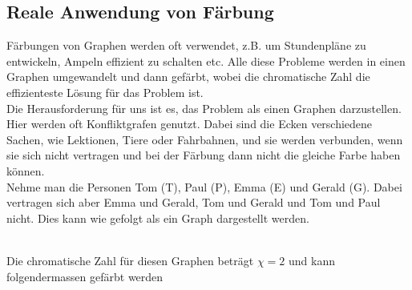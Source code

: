 \documentclass{article}
\begin{document}
\subsection{Reale Anwendung von Färbung}

Färbungen von Graphen werden oft verwendet, z.B. um Stundenpläne zu entwickeln, Ampeln effizient zu schalten etc. Alle diese Probleme werden in einen Graphen umgewandelt und dann gefärbt, wobei die chromatische Zahl die effizienteste Lösung für das Problem ist. \\

\noindent Die Herausforderung für uns ist es, das Problem als einen Graphen darzustellen. Hier werden oft Konfliktgrafen genutzt. Dabei sind die Ecken verschiedene Sachen, wie Lektionen, Tiere oder Fahrbahnen, und sie werden verbunden, wenn sie sich nicht vertragen und bei der Färbung dann nicht die gleiche Farbe haben können. \\

\noindent Nehme man die Personen Tom (T), Paul (P), Emma (E) und Gerald (G). Dabei vertragen sich aber Emma und Gerald, Tom und Gerald und Tom und Paul nicht. Dies kann wie gefolgt als ein Graph dargestellt werden. \\

 \\

\noindent Die chromatische Zahl für diesen Graphen beträgt \(\chi=2\) und kann folgendermassen gefärbt werden \\
 
 \\
\end{document}
